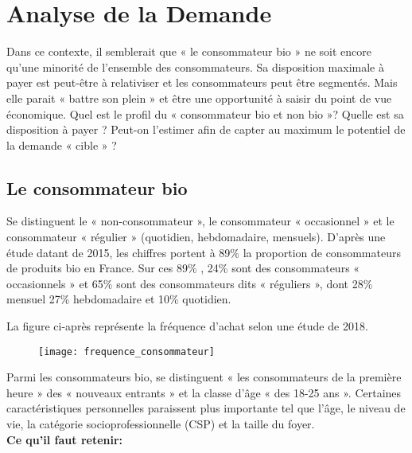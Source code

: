 \documentclass[12pt,a4paper]{report}
\begin{document}
	 
	 
	 
	 
	 
	 
	 
	 
	 
	 
	 \section{Analyse de la Demande}
	 
	 Dans ce contexte, il semblerait que « le consommateur bio » ne soit encore qu’une minorité de l’ensemble des consommateurs. Sa disposition maximale à payer est peut-être à relativiser et les consommateurs peut être segmentés. Mais elle parait « battre son plein » et être une opportunité à saisir du point de vue économique. Quel est le profil du « consommateur bio et non bio »? Quelle est sa disposition à payer ? Peut-on l’estimer afin de capter au maximum le potentiel de la demande « cible » ?
	 
	 \subsection{Le consommateur bio}
	 
	 Se distinguent le « non-consommateur », le consommateur « occasionnel » et le consommateur « régulier » (quotidien, hebdomadaire, mensuels). D’après une étude datant de 2015, les chiffres portent à 89\% la proportion de consommateurs de produits bio en France. Sur ces 89\% , 24\% sont des consommateurs « occasionnels » et 65\% sont des consommateurs dits « réguliers », dont 28\% mensuel 27\% hebdomadaire et 10\% quotidien.
	 
	  La figure ci-après représente la fréquence d'achat selon une étude de 2018.
	 
	 
	 
	 \begin{figure}[h]
	 		\centering
	 		\texttt{[image: frequence\_consommateur]}
	 \end{figure}
	 
	 
	 
	Parmi les consommateurs bio,  se distinguent « les consommateurs de la première heure » des « nouveaux entrants » et la classe d’âge « des 18-25 ans ». Certaines caractéristiques personnelles paraissent plus importante tel que l’âge, le niveau de vie, la catégorie socioprofessionnelle (CSP) et la taille du foyer.\\
	
\textbf{Ce qu'il faut retenir:}\\
\end{document}
